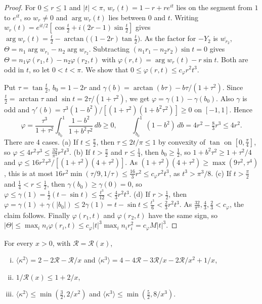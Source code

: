 \begin{proof}
For $0\le r\le1$ and $|t|<\pi$, $w_r(t)=1-r+re^{it}$ lies on the segment from $1$ to $e^{it}$, so
$w_r\ne0$ and $\arg w_r(t)$ lies between $0$ and $t$. Writing
$w_r(t)=e^{it/2}[\cos\frac t2+i(2r-1)\sin\frac t2]$ gives
$\arg w_r(t)=\frac t2-\arctan\bigl((1-2r)\tan\frac t2\bigr)$. As the factor for $-Y_2$ is
$\overline{w_{r_2}}$, $\Theta=n_1\arg w_{r_1}-n_2\arg w_{r_2}$. Subtracting
$(n_1r_1-n_2r_2)\sin t=0$ gives $\Theta=n_1\varphi(r_1,t)-n_2\varphi(r_2,t)$ with
$\varphi(r,t)=\arg w_r(t)-r\sin t$. Both are odd in $t$, so let $0<t<\pi$. We show that
$0\le\varphi(r,t)\le c_\varphi r^2t^3$.

Put $\tau=\tan\frac t2$, $b_0=1-2r$ and $\gamma(b)=\arctan(b\tau)-b\tau/(1+\tau^2)$. Since
$\frac t2=\arctan\tau$ and $\sin t=2\tau/(1+\tau^2)$, we get $\varphi=\gamma(1)-\gamma(b_0)$. Also
$\gamma$ is odd and $\gamma'(b)=\tau^3(1-b^2)/[(1+\tau^2)(1+b^2\tau^2)]\ge0$ on $[-1,1]$. Hence
\[
\varphi=\frac{\tau^3}{1+\tau^2}\int_{b_0}^1\frac{1-b^2}{1+b^2\tau^2}\,db\ge0,\qquad
\int_{b_0}^1(1-b^2)\,db=4r^2-\tfrac83r^3\le4r^2.
\]
There are 4 cases.
(a) If $t\le\frac\pi2$, then $\tau\le2t/\pi\le1$ by convexity of $\tan$ on $[0,\frac\pi4]$, so
$\varphi\le4r^2\tau^3\le\frac{32}{\pi^3}r^2t^3$.
(b) If $t>\frac\pi2$ and $r\le\frac14$, then $b_0\ge\frac12$, so $1+b^2\tau^2\ge1+\tau^2/4$ and
$\varphi\le16r^2\tau^3/[(1+\tau^2)(4+\tau^2)]$. As $(1+\tau^2)(4+\tau^2)\ge\max(9\tau^2,\tau^4)$,
this is at most $16r^2\min(\tau/9,1/\tau)\le\frac{16}3r^2\le c_\varphi r^2t^3$, as $t^3>\pi^3/8$.
(c) If $t>\frac\pi2$ and $\frac14<r\le\frac12$, then $\gamma(b_0)\ge\gamma(0)=0$, so
$\varphi\le\gamma(1)=\frac12(t-\sin t)\le\frac{t^3}{12}<\frac43r^2t^3$.
(d) If $r>\frac12$, then
$\varphi=\gamma(1)+\gamma(|b_0|)\le2\gamma(1)=t-\sin t\le\frac{t^3}6<\frac23r^2t^3$.
As $\frac{32}{\pi^3},\frac43,\frac23<c_\varphi$, the claim follows. Finally
$\varphi(r_1,t)$ and $\varphi(r_2,t)$ have the same sign, so
$|\Theta|\le\max_in_i\varphi(r_i,t)\le c_\varphi|t|^3\max_in_ir_i^2=c_\varphi M|t|^3$.
\end{proof}

\begin{lemma}[moments]\label{lem:llt-moments}
For every $x>0$, with $\mathcal R=\mathcal R(x)$,
\begin{enumerate}[(i)]
\item $\langle\kappa^2\rangle=2-2\mathcal R-\mathcal R/x$ and
$\langle\kappa^3\rangle=4-4\mathcal R-3\mathcal R/x-2\mathcal R/x^2+1/x$,
\item $1/\mathcal R(x)\le1+2/x$,
\item $\langle\kappa^2\rangle\le\min(\frac32,2/x^2)$ and $\langle\kappa^3\rangle\le\min(\frac52,8/x^3)$.
\end{enumerate}
\end{lemma}

